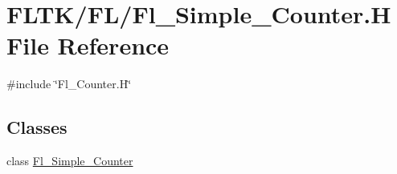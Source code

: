 \hypertarget{_fl___simple___counter_8_h}{}\section{F\+L\+T\+K/\+F\+L/\+Fl\+\_\+\+Simple\+\_\+\+Counter.H File Reference}
\label{_fl___simple___counter_8_h}
{\ttfamily \#include \char`\"{}Fl\+\_\+\+Counter.\+H\char`\"{}}\newline
\subsection*{Classes}
\begin{DoxyCompactItemize}
\item 
class \hyperlink{class_fl___simple___counter}{Fl\+\_\+\+Simple\+\_\+\+Counter}
\end{DoxyCompactItemize}
